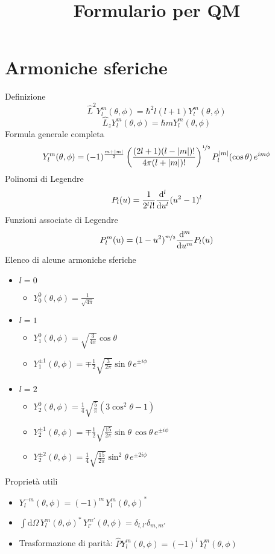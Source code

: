 \documentclass{article}
\title{Formulario per QM}
\newcommand{\deh}{\mathrm{d}}
\newcommand{\onehalf}{\nicefrac{1}{2}}
\newcommand{\der}[2][1]{\if 1#1 \frac{\deh}{\deh #2} \else \frac{\deh^#1}{\deh #2^#1} \fi}
\begin{document}
\maketitle

\section{Armoniche sferiche}
Definizione
\[\hat{L}^2Y_l^m(\theta,\phi)=\hbar^2 l(l+1) Y_l^m(\theta,\phi)\]
\[\hat{L}_zY_l^m(\theta,\phi)=\hbar m Y_l^m(\theta,\phi)\]
Formula generale completa
\[Y_l^m(\theta,\phi)=(-1)^\frac{m+|m|}{2}\left(\frac{(2l+1)(l-|m|)!}{4\pi (l+|m|)!}\right)^{\onehalf} P_l^{|m|}(\cos\theta)\,e^{im\phi}\]
Polinomi di Legendre \[P_l(u)=\frac{1}{2^l l!} \der[l]{u}(u^2-1)^l\]
Funzioni associate di Legendre \[P_l^m(u)=(1-u^2)^{\nicefrac{m}{2}} \der[m]{u}P_l(u)\]
Elenco di alcune armoniche sferiche
\begin{itemize}
    \item $l=0$ 
    \begin{itemize}
        \item[] $Y_0^0(\theta,\phi)=\frac{1}{\sqrt{4\pi}}$
    \end{itemize}
    \item $l=1$
    \begin{itemize}
        \item[] $Y_1^0(\theta,\phi)=\sqrt{\frac{3}{4\pi}}\cos\theta$
        \item[] $Y_1^{\pm 1}(\theta,\phi)=\mp\frac{1}{2}\sqrt{\frac{3}{2\pi}}\sin\theta\,e^{\pm i\phi}$
    \end{itemize}
    \item $l=2$
    \begin{itemize}
        \item[] $Y_2^0(\theta,\phi)=\frac{1}{4}\sqrt{\frac{5}{\pi}}(3 \cos^2\theta-1)$
        \item[] $Y_2^{\pm 1}(\theta,\phi)=\mp\frac{1}{2}\sqrt{\frac{15}{2\pi}}\sin\theta\,\cos\theta\,e^{\pm i\phi}$
        \item[] $Y_2^{\pm 2}(\theta,\phi)=\frac{1}{4}\sqrt{\frac{15}{2\pi}}\sin^2\theta\,e^{\pm2i\phi}$
    \end{itemize}
\end{itemize}
Proprietà utili
\begin{itemize}
    \item[] $Y_l^{-m}(\theta,\phi)=(-1)^m\, Y_l^m(\theta,\phi)^*$
    \item[] $\int \deh\Omega\, Y_l^m(\theta,\phi)^*\,Y_{l'}^{m'}(\theta,\phi)=\delta_{l,l'}\delta_{m,m'} $ 
    \item[] Trasformazione di parità: \quad $\hat{P} Y_l^m(\theta,\phi)=(-1)^l \,Y_l^m(\theta,\phi)$
\end{itemize}
\end{document}

